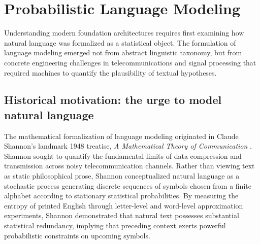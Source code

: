 \documentclass[../../main.tex]{subfiles}
\begin{document}
\clearpage
\section{Probabilistic Language Modeling}
\label{sec:lm_intro_task}

Understanding modern foundation architectures requires first examining how natural language was formalized as a statistical object. The formulation of language modeling emerged not from abstract linguistic taxonomy, but from concrete engineering challenges in telecommunications and signal processing that required machines to quantify the plausibility of textual hypotheses.

\subsection{Historical motivation: the urge to model natural language}
\label{subsec:lm_historical_motivation}

The mathematical formalization of language modeling originated in Claude Shannon's landmark 1948 treatise, \textit{A Mathematical Theory of Communication} \citep{shannon1948}. Shannon sought to quantify the fundamental limits of data compression and transmission across noisy telecommunication channels. Rather than viewing text as static philosophical prose, Shannon conceptualized natural language as a stochastic process generating discrete sequences of symbols chosen from a finite alphabet according to stationary statistical probabilities. By measuring the entropy of printed English through letter-level and word-level approximation experiments, Shannon demonstrated that natural text possesses substantial statistical redundancy, implying that preceding context exerts powerful probabilistic constraints on upcoming symbols.
\end{document}
